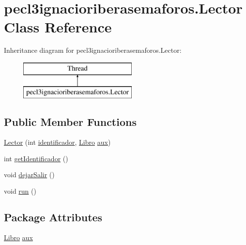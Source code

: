 \hypertarget{classpecl3ignacioriberasemaforos_1_1_lector}{}\section{pecl3ignacioriberasemaforos.\+Lector Class Reference}
\label{classpecl3ignacioriberasemaforos_1_1_lector}
Inheritance diagram for pecl3ignacioriberasemaforos.\+Lector\+:\begin{figure}[H]
\begin{center}
\leavevmode
\includegraphics[height=2.000000cm]{classpecl3ignacioriberasemaforos_1_1_lector}
\end{center}
\end{figure}
\subsection*{Public Member Functions}
\begin{DoxyCompactItemize}
\item 
\mbox{\hyperlink{classpecl3ignacioriberasemaforos_1_1_lector_ad076c2c27e64d56da720712f78da2773}{Lector}} (int \mbox{\hyperlink{classpecl3ignacioriberasemaforos_1_1_lector_a63b92fb248e0937e631b8c140de16562}{identificador}}, \mbox{\hyperlink{classpecl3ignacioriberasemaforos_1_1_libro}{Libro}} \mbox{\hyperlink{classpecl3ignacioriberasemaforos_1_1_lector_a3fc7cbee0daccfbbb55d9922817b438a}{aux}})
\item 
int \mbox{\hyperlink{classpecl3ignacioriberasemaforos_1_1_lector_a906720a5f2026ba5ff7ce12fb8105563}{get\+Identificador}} ()
\item 
void \mbox{\hyperlink{classpecl3ignacioriberasemaforos_1_1_lector_a67e4a74ee75eaffe05db37004246deb2}{dejar\+Salir}} ()
\item 
void \mbox{\hyperlink{classpecl3ignacioriberasemaforos_1_1_lector_ab29ca4d0da930d4fedc93ff1d3caf3c9}{run}} ()
\end{DoxyCompactItemize}
\subsection*{Package Attributes}
\begin{DoxyCompactItemize}
\item 
\mbox{\hyperlink{classpecl3ignacioriberasemaforos_1_1_libro}{Libro}} \mbox{\hyperlink{classpecl3ignacioriberasemaforos_1_1_lector_a3fc7cbee0daccfbbb55d9922817b438a}{aux}}
\end{DoxyCompactItemize}
